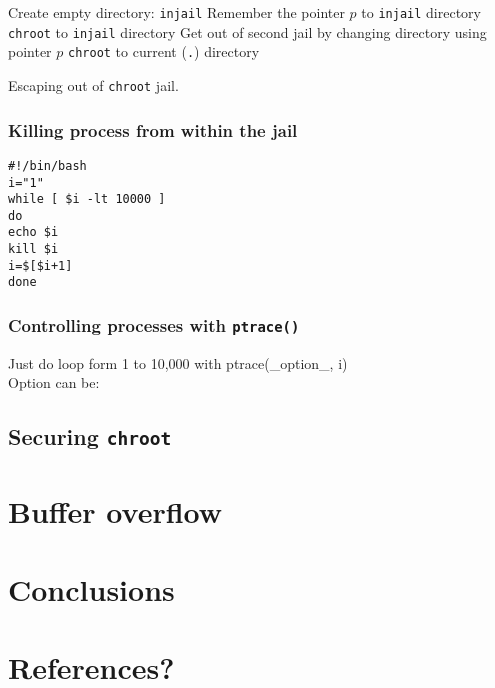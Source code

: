 \documentclass[12pt, a4paper, pdflatex]{article}
\begin{document}
\SetAlCapSkip{1em}
\LinesNumbered
{}
\vspace{1em}
\begin{algorithm}[h]
  Create empty directory: \texttt{injail}\;
  Remember the pointer $p$ to \texttt{injail} directory\;
  \texttt{chroot} to \texttt{injail} directory\;
  Get out of second jail by changing directory using pointer $p$\;
  \texttt{chroot} to current (\texttt{.}) directory\;
  \caption{Escaping out of \texttt{chroot} jail.\label{alg:chroot:cd}}
\end{algorithm}
\vspace{1em}

\subsubsection{Killing process from within the jail}
\vspace{1em}
\lstset{
  captionpos=b,
  frame=single,
  language=bash,
  breaklines=true,
  caption=Kill processes outside of chroot jail.,
  label=chroot:kill
}
\begin{lstlisting}
#!/bin/bash
i="1"
while [ $i -lt 10000 ]
do
echo $i
kill $i
i=$[$i+1]
done
\end{lstlisting}

\subsubsection{Controlling processes with \texttt{ptrace()}}
Just do loop form 1 to 10,000 with ptrace(\_option\_, i)\\
Option can be: 

\subsection{Securing \texttt{chroot}}

\section{Buffer overflow}
\lipsum[3]

\section{Conclusions}

\section{References?}
\end{document}
